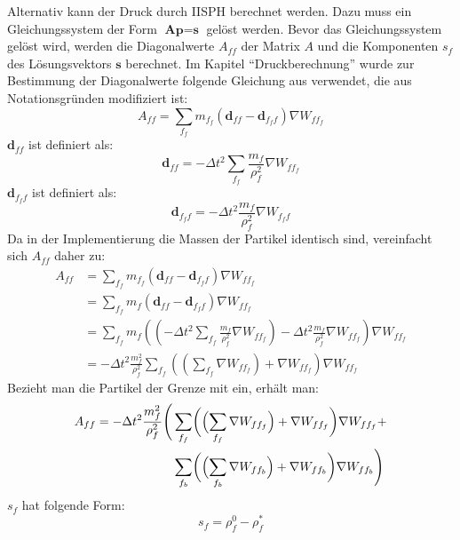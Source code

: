 \documentclass{scrreprt}
\begin{document}
Alternativ kann der Druck durch IISPH \cite{ihmsen_implicit_2014} berechnet werden.
Dazu muss ein Gleichungssystem der Form $\textbf{A} \textbf{p} = \textbf{s}$ gelöst werden.
Bevor das Gleichungssystem gelöst wird, werden die Diagonalwerte $A_{ff}$ der Matrix $A$ und die Komponenten $s_f$ des Lösungsvektors $\textbf{s}$ berechnet.
Im Kapitel "`Druckberechnung"' wurde zur Bestimmung der Diagonalwerte folgende Gleichung aus \cite{ihmsen_implicit_2014} verwendet,
die aus Notationsgründen modifiziert ist:
\begin{equation}
    A_{ff} = \sum_{f_f} m_{f_f} \left(\textbf{d}_{ff} - \textbf{d}_{f_f f}\right)  \nabla W_{ff_f}
\end{equation}
$\textbf{d}_{ff}$ ist definiert als:
\begin{equation}
    \textbf{d}_{ff} = -\Delta t^2 \sum_{f_f} \frac{m_f}{\rho_f^2} \nabla W_{ff_f}
\end{equation}
$\textbf{d}_{f_f f}$ ist definiert als:
\begin{equation}
    \textbf{d}_{f_f f} = -\Delta t^2 \frac{m_f}{\rho_f^2} \nabla W_{f_f f}
\end{equation}
Da in der Implementierung die Massen der Partikel identisch sind, vereinfacht sich $A_{ff}$ daher zu:
\begin{align}
    A_{ff} &= \sum_{f_f} m_{f_f} \left(\textbf{d}_{ff} - \textbf{d}_{f_f f}\right)  \nabla W_{ff_f}\\
        &= \sum_{f_f} m_f \left(\textbf{d}_{ff} - \textbf{d}_{f_f f}\right)  \nabla W_{ff_f}\\
        &= \sum_{f_f} m_f 
        \left(\left(-\Delta t^2 \sum_{f_f} \frac{m_f}{\rho_f^2} \nabla W_{ff_f}\right) - \Delta t^2 \frac{m_f}{\rho_f^2} \nabla W_{ff_f}\right) 
        \nabla W_{ff_f}\\
        &= - \Delta t^2 \frac{m_f^2}{\rho_f^2} \sum_{f_f} \left(\left(\sum_{f_f} \nabla W_{ff_f}\right) + \nabla W_{ff_f}\right) \nabla W_{ff_f}
\end{align}
Bezieht man die Partikel der Grenze mit ein, erhält man:
\begin{align}
    A_{ff} = - \Delta t^2 \frac{m_f^2}{\rho_f^2} \Biggl(&\sum_{f_f} \biggl(\Bigl(\sum_{f_f} \nabla W_{ff_f}\Bigr) + \nabla W_{ff_f}\biggr) \nabla W_{ff_f}+\\
        &\sum_{f_b} \biggl(\Bigl(\sum_{f_b} \nabla W_{ff_b}\Bigr) + \nabla W_{ff_b}\biggr) \nabla W_{ff_b}\Biggr)
\end{align}
$s_f$ hat folgende Form:
\begin{equation}
    s_f = \rho_f^0 - \rho_f^*
\end{equation}
\end{document}
